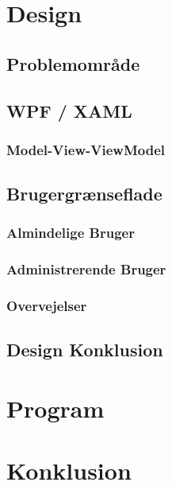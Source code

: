 \chapter{Design}

\section{Problemområde}

\section{WPF / XAML}
\subsection{Model-View-ViewModel}

\section{Brugergrænseflade}
\subsection{Almindelige Bruger}
\subsection{Administrerende Bruger}
\subsection{Overvejelser}

\section{Design Konklusion}
%

\chapter{Program}


\chapter{Konklusion}

